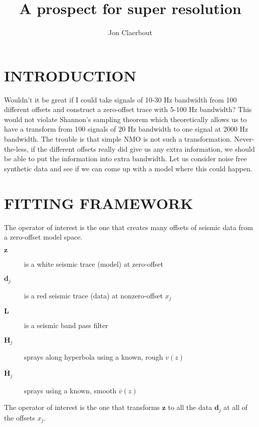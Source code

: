 


\title{
	A prospect for super resolution
        }
\author{Jon Claerbout}
\def\eq{\quad =\quad}
\maketitle

\section{INTRODUCTION}

Wouldn't it be great if I could take signals of
10-30 Hz bandwidth
from 100 different offsets and construct a zero-offset trace with 5-100 Hz
bandwidth?
This would not violate Shannon's sampling theorem
which theoretically allows us to have a transform
from 100 signals of 20 Hz bandwidth to one signal
at 2000 Hz bandwidth.
The trouble is that simple NMO is not such a transformation.
Never-the-less,
if the different offsets really did give us any extra information,
we should be able to put the information into extra bandwidth.
Let us consider noise free synthetic data and see
if we can come up with a model where this could happen.

\section{FITTING FRAMEWORK}

\par
The operator of interest is the one that creates many offsets
of seismic data from a zero-offset model space.
\begin{description}
\item [$\mathbf z$]
	is a white seismic trace (model) at zero-offset
\item [$\mathbf d_j$]
	is a red seismic trace (data) at nonzero-offset $x_j$
\item [$\mathbf L$]	is a seismic band pass filter
\item [$\mathbf H_j$]
			sprays along hyperbola
				using a known, rough  $v(z)$ 
\item [$\overline{\mathbf H}_j$]
			sprays 
				using a known, smooth $\overline{v}(z)$
\end{description}
The operator of interest is the one that transforms
$\mathbf z$ to all the data
$\mathbf d_j$
at all of the offsets $x_j$.

